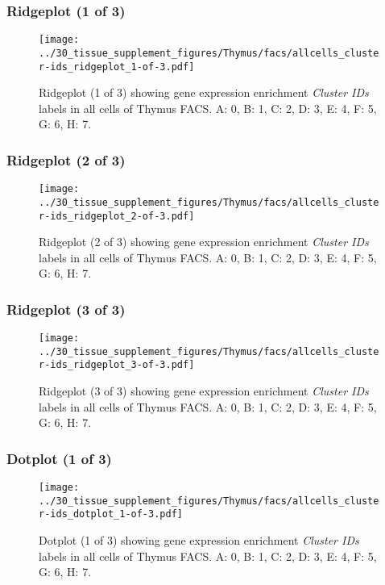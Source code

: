 \clearpage

\subsubsection{Ridgeplot (1 of 3)}
\begin{figure}[h]
\centering
\texttt{[image: ../30\_tissue\_supplement\_figures/Thymus/facs/allcells\_cluster-ids\_ridgeplot\_1-of-3.pdf]}

\caption{ Ridgeplot (1 of 3)  showing gene expression enrichment \emph{Cluster IDs} labels in all cells of Thymus FACS. A: 0, B: 1, C: 2, D: 3, E: 4, F: 5, G: 6, H: 7.}
\end{figure}


\clearpage

\subsubsection{Ridgeplot (2 of 3)}
\begin{figure}[h]
\centering
\texttt{[image: ../30\_tissue\_supplement\_figures/Thymus/facs/allcells\_cluster-ids\_ridgeplot\_2-of-3.pdf]}

\caption{ Ridgeplot (2 of 3)  showing gene expression enrichment \emph{Cluster IDs} labels in all cells of Thymus FACS. A: 0, B: 1, C: 2, D: 3, E: 4, F: 5, G: 6, H: 7.}
\end{figure}


\clearpage

\subsubsection{Ridgeplot (3 of 3)}
\begin{figure}[h]
\centering
\texttt{[image: ../30\_tissue\_supplement\_figures/Thymus/facs/allcells\_cluster-ids\_ridgeplot\_3-of-3.pdf]}

\caption{ Ridgeplot (3 of 3)  showing gene expression enrichment \emph{Cluster IDs} labels in all cells of Thymus FACS. A: 0, B: 1, C: 2, D: 3, E: 4, F: 5, G: 6, H: 7.}
\end{figure}


\clearpage

\subsubsection{Dotplot (1 of 3)}
\begin{figure}[h]
\centering
\texttt{[image: ../30\_tissue\_supplement\_figures/Thymus/facs/allcells\_cluster-ids\_dotplot\_1-of-3.pdf]}

\caption{ Dotplot (1 of 3)  showing gene expression enrichment \emph{Cluster IDs} labels in all cells of Thymus FACS. A: 0, B: 1, C: 2, D: 3, E: 4, F: 5, G: 6, H: 7.}
\end{figure}


